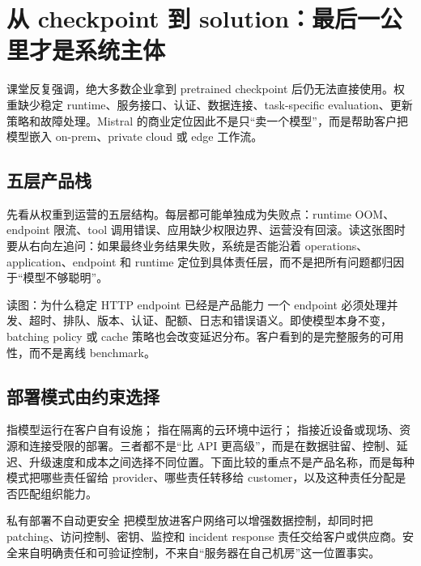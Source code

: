 \section{从 checkpoint 到 solution：最后一公里才是系统主体}

课堂反复强调，绝大多数企业拿到 pretrained checkpoint 后仍无法直接使用。权重缺少稳定 runtime、服务接口、认证、数据连接、task-specific evaluation、更新策略和故障处理。Mistral 的商业定位因此不是只“卖一个模型”，而是帮助客户把模型嵌入 on-prem、private cloud 或 edge 工作流。

\subsection{五层产品栈}

先看从权重到运营的五层结构。每层都可能单独成为失败点：runtime OOM、endpoint 限流、tool 调用错误、应用缺少权限边界、运营没有回滚。读这张图时要从右向左追问：如果最终业务结果失败，系统是否能沿着 operations、application、endpoint 和 runtime 定位到具体责任层，而不是把所有问题都归因于“模型不够聪明”。


\begin{knowledgebox}{读图：为什么稳定 HTTP endpoint 已经是产品能力}
一个 endpoint 必须处理并发、超时、排队、版本、认证、配额、日志和错误语义。即使模型本身不变，batching policy 或 cache 策略也会改变延迟分布。客户看到的是完整服务的可用性，而不是离线 benchmark。
\end{knowledgebox}

\subsection{部署模式由约束选择}

 指模型运行在客户自有设施； 指在隔离的云环境中运行； 指接近设备或现场、资源和连接受限的部署。三者都不是“比 API 更高级”，而是在数据驻留、控制、延迟、升级速度和成本之间选择不同位置。下面比较的重点不是产品名称，而是每种模式把哪些责任留给 provider、哪些责任转移给 customer，以及这种责任分配是否匹配组织能力。


\begin{warningbox}{私有部署不自动更安全}
把模型放进客户网络可以增强数据控制，却同时把 patching、访问控制、密钥、监控和 incident response 责任交给客户或供应商。安全来自明确责任和可验证控制，不来自“服务器在自己机房”这一位置事实。
\end{warningbox}

